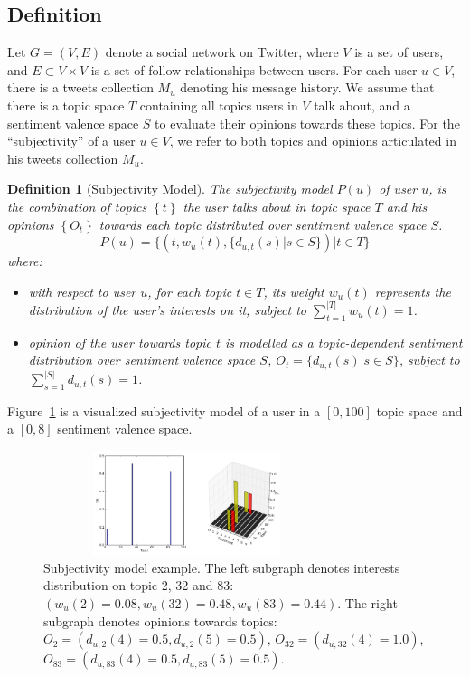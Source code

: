 \documentclass{acm_proc_article-sp}
\newtheorem{definition}{Definition}
\begin{document}
\subsection{Definition}
\label{definition}

Let $G=\left( V,E \right) $ denote a social network on Twitter, where $ V $ is a set of users, and $ E\subset V\times V $ is a set of follow relationships between users. For each user $ u \in V $, there is a tweets collection $ M_{u} $ denoting his message history. We assume that there is a topic space $ T $ containing all topics users in $ V $ talk about, and a sentiment valence space $ S $ to evaluate their opinions towards these topics. 
For the ``subjectivity'' of a user $ u  \in V $, we refer to both topics and opinions articulated in his tweets collection $ M_{u} $.  
\begin{definition}[Subjectivity Model]
The subjectivity model $ P \left( u \right) $ of user $ u $, is the combination of topics $\left\lbrace  t \right\rbrace $ the user talks about in topic space $T$ and his opinions $\left\lbrace O_{t}\right\rbrace $ towards each topic distributed over sentiment valence space $ S $. 
\begin{equation}
\label{usermodel}
P \left( u \right) = \lbrace \left( t, w_{u} \left( t \right), \lbrace d_{u,t} \left( s \right)|s \in S \rbrace \right) |  t \in T \rbrace
\end{equation}
where:
\begin{itemize}
\item with respect to user $ u $, for each topic $t \in T$, its weight $ w_{u} \left( t \right)$ represents the distribution of the user's interests on it, subject to $ \sum_{t=1}^{|T|}w_{u} \left( t \right)=1 $.
\item opinion of the user towards topic $t$ is modelled as a topic-dependent sentiment distribution over sentiment valence space $ S $, $O_{t}=\lbrace d_{u,t} \left( s \right)|s \in S \rbrace $, subject to $ \sum_{s=1}^{|S|} d_{u,t} \left( s \right)=1$.
\end{itemize}
\end{definition}
Figure~\ref{fig0} is a visualized subjectivity model of a user in a $ [0,100] $ topic space and a $ [0,8] $ sentiment valence space. 
\begin{figure}[t]
\includegraphics[width=3.3in,height=1.2in]{fig1.pdf}
\caption{Subjectivity model example. The left subgraph denotes interests distribution on topic 2, 32 and 83: $ (  w_{u}\left( 2 \right)=0.08,w_{u}\left( 32 \right)=0.48, w_{u}\left( 83 \right)=0.44)  $. The right subgraph denotes opinions towards topics: $ O_{2}=( d_{u,2} \left( 4 \right)=0.5, d_{u,2} \left( 5 \right)=0.5)$, $O_{32}=(d_{u,32} \left( 4 \right)=1.0) $, $ O_{83}=( d_{u,83} \left( 4 \right)=0.5, d_{u,83} \left( 5 \right)=0.5 ) $.}
\label{fig0}
\end{figure}
\end{document}
